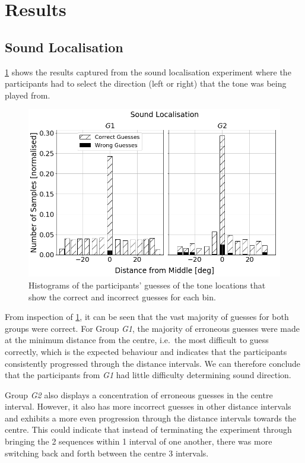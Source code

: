 \documentclass[]{interact}
\begin{document}
\section{Results}\label{sec:results}

\subsection{Sound Localisation}

\cref{fig:sound-localisation} shows the results captured from the sound localisation experiment where the participants had to select the direction (left or right) that the tone was being played from. 

\begin{figure}
  \centering
  \includegraphics[width=1.0\textwidth]{figures/sound_localisation.png}
  \caption{Histograms of the participants' guesses of the tone locations that show the correct and incorrect guesses for each bin. }\label{fig:sound-localisation}
\end{figure}

From inspection of \cref{fig:sound-localisation}, it can be seen that the vast majority of guesses for both groups were correct.
For Group \textit{G1}, the majority of erroneous guesses were made at the minimum distance from the centre, i.e.\ the most difficult to guess correctly, which is the expected behaviour and indicates that the participants consistently progressed through the distance intervals.
We can therefore conclude that the participants from \textit{G1} had little difficulty determining sound direction.

Group \textit{G2} also displays a concentration of erroneous guesses in the centre interval.
However, it also has more incorrect guesses in other distance intervals and exhibits a more even progression through the distance intervals towards the centre.
This could indicate that instead of terminating the experiment through bringing the 2 sequences within 1 interval of one another, there was more switching back and forth between the centre 3 intervals. 
\end{document}
